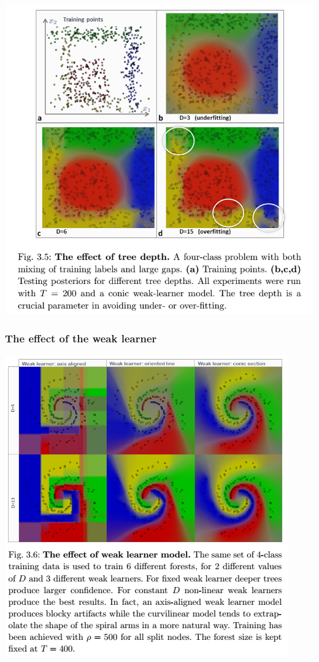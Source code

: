\documentclass{scrartcl}
\begin{document}
\begin{appendices}
\begin{center}
    \includegraphics[scale=0.6]{img/forestnoise}
\end{center}

\subsubsection{The effect of the weak learner}

\begin{center}
    \includegraphics[scale=0.9]{img/forestlearner}
\end{center}


\end{appendices}
\end{document}
